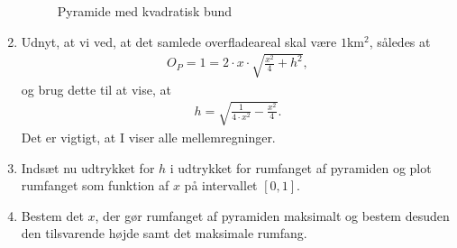 \begin{enumerate}[label=\roman*)]
\begin{figure}[H]
\caption{Pyramide med kvadratisk bund}
\label{fig:pyramide2}
\end{figure}
\item Udnyt, at vi ved, at det samlede overfladeareal skal være $1$km$^2$, således at 
\begin{align*}
O_P = 1 = 2\cdot x\cdot \sqrt{\frac{x^2}{4}+h^2},
\end{align*}
og brug dette til at vise, at 
\begin{align*}
h=\sqrt{\frac{1}{4\cdot x^2}-\frac{x^2}{4}}.
\end{align*}
Det er vigtigt, at I viser alle mellemregninger.
\item Indsæt nu udtrykket for $h$ i udtrykket for rumfanget af pyramiden og plot rumfanget som funktion af $x$ på intervallet $[0,1]$. 
\item Bestem det $x$, der gør rumfanget af pyramiden maksimalt og bestem desuden den tilsvarende højde samt det maksimale rumfang.
\end{enumerate}
